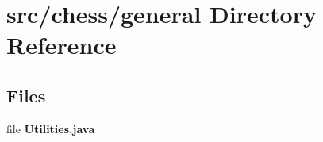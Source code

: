 \section{src/chess/general Directory Reference}
\label{dir_697a0097910ff28d0b0a37324f8e9400}
\subsection*{Files}
\begin{DoxyCompactItemize}
\item 
file {\bf Utilities.\+java}
\end{DoxyCompactItemize}
